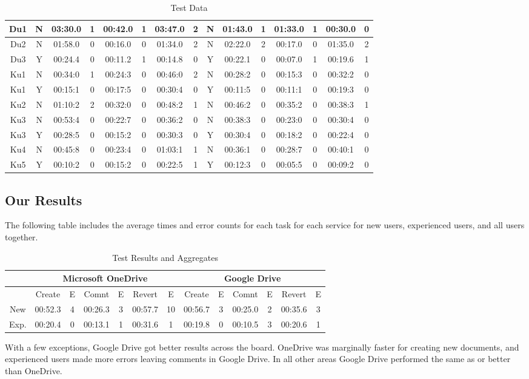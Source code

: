 \documentclass[a4paper,12pt]{article}
\begin{document}
\begin{table}[h]
\begin{tabular}{|c|c|c|c|c|c|c|c|c|c|c|c|c|c|c|}
Du1&N&03:30.0&1&00:42.0&1&03:47.0&2&N&01:43.0&1&01:33.0&1&00:30.0&0\\ \hline
Du2&N&01:58.0&0&00:16.0&0&01:34.0&2&N&02:22.0&2&00:17.0&0&01:35.0&2\\ \hline
Du3&Y&00:24.4&0&00:11.2&1&00:14.8&0&Y&00:22.1&0&00:07.0&1&00:19.6&1\\ \hline
Ku1&N&00:34:0&1&00:24:3&0&00:46:0&2&N&00:28:2&0&00:15:3&0&00:32:2&0\\ \hline
Ku1&Y&00:15:1&0&00:17:5&0&00:30:4&0&Y&00:11:5&0&00:11:1&0&00:19:3&0\\ \hline
Ku2&N&01:10:2&2&00:32:0&0&00:48:2&1&N&00:46:2&0&00:35:2&0&00:38:3&1\\ \hline
Ku3&N&00:53:4&0&00:22:7&0&00:36:2&0&N&00:38:3&0&00:23:0&0&00:30:4&0\\ \hline
Ku3&Y&00:28:5&0&00:15:2&0&00:30:3&0&Y&00:30:4&0&00:18:2&0&00:22:4&0\\ \hline
Ku4&N&00:45:8&0&00:23:4&0&01:03:1&1&N&00:36:1&0&00:28:7&0&00:40:1&0\\ \hline
Ku5&Y&00:10:2&0&00:15:2&0&00:22:5&1&Y&00:12:3&0&00:05:5&0&00:09:2&0\\ \hline
\end{tabular}
\caption{Test Data}
\end{table}
\subsection{Our Results}

The following table includes the average times and error counts for each task for each service for new users, experienced users, and all users together.

\begin{table}[h]
\small
\centering
\begin{tabular}{|c|c|c|c|c|c|c|c|c|c|c|c|c|}
\hline
& \multicolumn{6}{c}{Microsoft OneDrive} & \multicolumn{6}{|c|}{Google Drive}\\ \hline
&Create&E&Comnt&E&Revert&E&Create&E&Comnt&E&Revert&E\\ \hline
New&00:52.3&4&00:26.3&3&00:57.7&10&00:56.7&3&00:25.0&2&00:35.6&3\\ \hline
Exp.&00:20.4&0&00:13.1&1&00:31.6&1&00:19.8&0&00:10.5&3&00:20.6&1\\ \hline
\end{tabular}
\caption{Test Results and Aggregates}
\end{table}


With a few exceptions, Google Drive got better results across the board. OneDrive was marginally faster for creating new documents, and experienced users made more errors leaving comments in Google Drive. In all other areas Google Drive performed the same as or better than OneDrive. 
\end{document}
